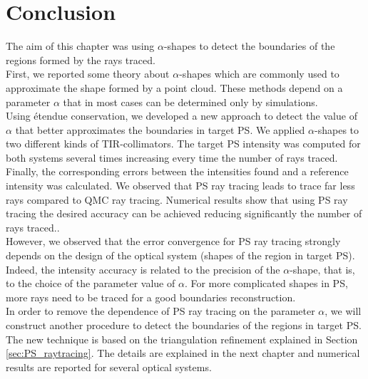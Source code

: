 \section{Conclusion}
The aim of this chapter was using $\alpha$-shapes to detect the boundaries of the regions formed by the rays traced.\\
\indent First, we reported some theory about $\alpha$-shapes which are commonly used to approximate the shape formed by a point cloud. 
These methods depend on a parameter $\alpha$ that in most cases can be determined only by simulations. 
\\ \indent Using \'{e}tendue conservation, we developed a new approach to detect the value of $\alpha$ that better approximates the boundaries in target PS. 
We applied $\alpha$-shapes to two different kinds of TIR-collimators. The target PS intensity was computed for both systems several times increasing every time the number of rays traced. Finally, the corresponding errors between the intensities found and a reference intensity was calculated. We observed that PS ray tracing leads to trace far less rays compared to QMC ray tracing. Numerical results show that using PS ray tracing the desired accuracy can be achieved reducing significantly the number of rays traced..\\ \indent 
However, we observed that the error convergence for PS ray tracing strongly depends on the design of the optical system (shapes of the region in target PS). Indeed, the intensity accuracy is related to the precision of the $\alpha$-shape, that is, to the choice of the parameter value of $\alpha$. For more complicated shapes in PS, more rays need to be traced for a good boundaries reconstruction.\\ \indent
In order to remove the dependence of PS ray tracing on the parameter $\alpha$, we will construct another procedure to detect the boundaries of the regions in target PS. 
The new technique is based on the triangulation refinement explained in Section \ref{sec:PS_raytracing}. The details are explained in the next chapter and numerical results are reported for several optical systems. 











































